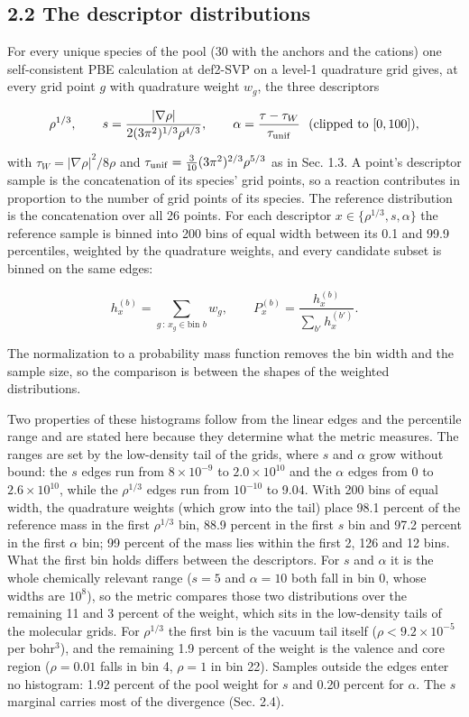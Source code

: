 \documentclass[10pt,a4paper]{article}
\begin{document}
\subsection*{2.2 The descriptor distributions}

For every unique species of the pool (30 with the anchors and the cations) one self-consistent PBE calculation at def2-SVP on a level-1 quadrature grid gives, at every grid point $g$ with quadrature weight $w_g$, the three descriptors

\[
\rho^{1/3}, \qquad
s = \frac{|\nabla \rho|}{2 (3\pi^2)^{1/3} \rho^{4/3}}, \qquad
\alpha = \frac{\tau - \tau_W}{\tau_{\rm unif}} \ \ \text{(clipped to } [0, 100]),
\]

with $\tau_W = |\nabla\rho|^2 / 8\rho$ and $\tau_{\rm unif} = \tfrac{3}{10}(3\pi^2)^{2/3}\rho^{5/3}$ as in Sec. 1.3. A point's descriptor sample is the concatenation of its species' grid points, so a reaction contributes in proportion to the number of grid points of its species. The reference distribution is the concatenation over all 26 points. For each descriptor $x \in \{\rho^{1/3}, s, \alpha\}$ the reference sample is binned into 200 bins of equal width between its 0.1 and 99.9 percentiles, weighted by the quadrature weights, and every candidate subset is binned on the same edges:

\[
h_x^{(b)} = \sum_{g \,:\, x_g \in \text{bin } b} w_g, \qquad
P_x^{(b)} = \frac{h_x^{(b)}}{\sum_{b'} h_x^{(b')}} .
\]

The normalization to a probability mass function removes the bin width and the sample size, so the comparison is between the shapes of the weighted distributions.

Two properties of these histograms follow from the linear edges and the percentile range and are stated here because they determine what the metric measures. The ranges are set by the low-density tail of the grids, where $s$ and $\alpha$ grow without bound: the $s$ edges run from $8 \times 10^{-9}$ to $2.0 \times 10^{10}$ and the $\alpha$ edges from 0 to $2.6 \times 10^{10}$, while the $\rho^{1/3}$ edges run from $10^{-10}$ to 9.04. With 200 bins of equal width, the quadrature weights (which grow into the tail) place 98.1 percent of the reference mass in the first $\rho^{1/3}$ bin, 88.9 percent in the first $s$ bin and 97.2 percent in the first $\alpha$ bin; 99 percent of the mass lies within the first 2, 126 and 12 bins. What the first bin holds differs between the descriptors. For $s$ and $\alpha$ it is the whole chemically relevant range ($s = 5$ and $\alpha = 10$ both fall in bin 0, whose widths are $10^8$), so the metric compares those two distributions over the remaining 11 and 3 percent of the weight, which sits in the low-density tails of the molecular grids. For $\rho^{1/3}$ the first bin is the vacuum tail itself ($\rho < 9.2 \times 10^{-5}$ per bohr$^3$), and the remaining 1.9 percent of the weight is the valence and core region ($\rho = 0.01$ falls in bin 4, $\rho = 1$ in bin 22). Samples outside the edges enter no histogram: 1.92 percent of the pool weight for $s$ and 0.20 percent for $\alpha$. The $s$ marginal carries most of the divergence (Sec. 2.4).
\end{document}
